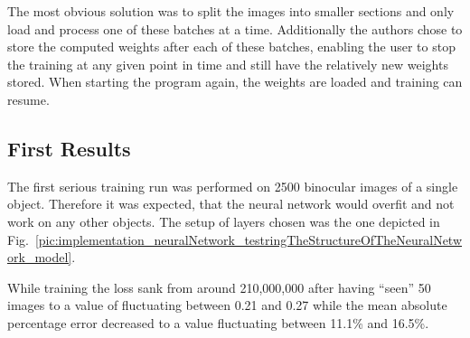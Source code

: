 The most obvious solution was to split the images into smaller sections and only load and process one of these batches at a time. Additionally the authors chose to store the computed weights after each of these batches, enabling the user to stop the training at any given point in time and still have the relatively new weights stored. When starting the program again, the weights are loaded and training can resume.

\subsection{First Results}
The first serious training run was performed on 2500 binocular images of a single object. Therefore it was expected, that the neural network would overfit and not work on any other objects. The setup of layers chosen was the one depicted in Fig.~\ref{pic:implementation_neuralNetwork_testringTheStructureOfTheNeuralNetwork_model}.

While training the loss sank from around 210,000,000 after having ``seen'' 50 images to a value of fluctuating between 0.21 and 0.27 while the mean absolute percentage error decreased to a value fluctuating between 11.1\% and 16.5\%.

